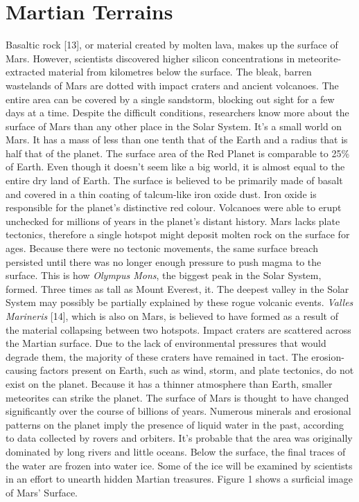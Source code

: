 \documentclass[conference]{IEEEtran}
\begin{document}
\section{Martian Terrains}
Basaltic rock [13], or material created by molten lava, makes up the surface of Mars. However, scientists discovered higher silicon concentrations in meteorite-extracted material from kilometres below the surface. The bleak, barren wastelands of Mars are dotted with impact craters and ancient volcanoes. The entire area can be covered by a single sandstorm, blocking out sight for a few days at a time. Despite the difficult conditions, researchers know more about the surface of Mars than any other place in the Solar System. It's a small world on Mars. It has a mass of less than one tenth that of the Earth and a radius that is half that of the planet. The surface area of the Red Planet is comparable to 25\% of Earth. Even though it doesn't seem like a big world, it is almost equal to the entire dry land of Earth. The surface is believed to be primarily made of basalt and covered in a thin coating of talcum-like iron oxide dust. Iron oxide is responsible for the planet's distinctive red colour. Volcanoes were able to erupt unchecked for millions of years in the planet's distant history. Mars lacks plate tectonics, therefore a single hotspot might deposit molten rock on the surface for ages. Because there were no tectonic movements, the same surface breach persisted until there was no longer enough pressure to push magma to the surface. This is how \textit{Olympus Mons}, the biggest peak in the Solar System, formed. Three times as tall as Mount Everest, it. The deepest valley in the Solar System may possibly be partially explained by these rogue volcanic events. \textit{Valles Marineris} [14], which is also on Mars, is believed to have formed as a result of the material collapsing between two hotspots. Impact craters are scattered across the Martian surface. Due to the lack of environmental pressures that would degrade them, the majority of these craters have remained in tact. The erosion-causing factors present on Earth, such as wind, storm, and plate tectonics, do not exist on the planet. Because it has a thinner atmosphere than Earth, smaller meteorites can strike the planet. The surface of Mars is thought to have changed significantly over the course of billions of years. Numerous minerals and erosional patterns on the planet imply the presence of liquid water in the past, according to data collected by rovers and orbiters. It's probable that the area was originally dominated by long rivers and little oceans. Below the surface, the final traces of the water are frozen into water ice. Some of the ice will be examined by scientists in an effort to unearth hidden Martian treasures. Figure 1 shows a surficial image of Mars' Surface. 
\end{document}
